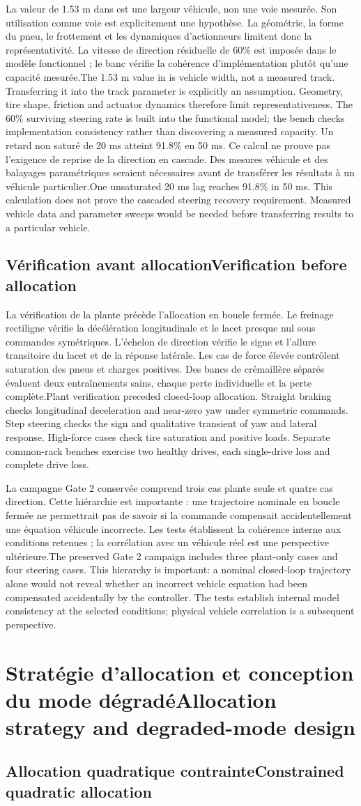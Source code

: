 \documentclass[11pt,a4paper,oneside]{report}
\newcommand{\bi}[2]{\iffrench #2\else #1\fi}
\newcommand{\chap}[2]{\chapter{\bi{#1}{#2}}}
\renewcommand{\sec}[2]{\section{\bi{#1}{#2}}}
\begin{document}
\bi{The 1.53 m value in \cite{li} is vehicle width, not a measured track. Transferring it into the track parameter is explicitly an assumption. Geometry, tire shape, friction and actuator dynamics therefore limit representativeness. The 60\% surviving steering rate is built into the functional model; the bench checks implementation consistency rather than discovering a measured capacity.}{La valeur de 1.53 m dans \cite{li} est une largeur véhicule, non une voie mesurée. Son utilisation comme voie est explicitement une hypothèse. La géométrie, la forme du pneu, le frottement et les dynamiques d'actionneurs limitent donc la représentativité. La vitesse de direction résiduelle de 60\% est imposée dans le modèle fonctionnel ; le banc vérifie la cohérence d'implémentation plutôt qu'une capacité mesurée.}
\bi{One unsaturated 20 ms lag reaches 91.8\% in 50 ms. This calculation does not prove the cascaded steering recovery requirement. Measured vehicle data and parameter sweeps would be needed before transferring results to a particular vehicle.}{Un retard non saturé de 20 ms atteint 91.8\% en 50 ms. Ce calcul ne prouve pas l'exigence de reprise de la direction en cascade. Des mesures véhicule et des balayages paramétriques seraient nécessaires avant de transférer les résultats à un véhicule particulier.}

\sec{Verification before allocation}{Vérification avant allocation}
\bi{Plant verification preceded closed-loop allocation. Straight braking checks longitudinal deceleration and near-zero yaw under symmetric commands. Step steering checks the sign and qualitative transient of yaw and lateral response. High-force cases check tire saturation and positive loads. Separate common-rack benches exercise two healthy drives, each single-drive loss and complete drive loss.}{La vérification de la plante précède l'allocation en boucle fermée. Le freinage rectiligne vérifie la décélération longitudinale et le lacet presque nul sous commandes symétriques. L'échelon de direction vérifie le signe et l'allure transitoire du lacet et de la réponse latérale. Les cas de force élevée contrôlent saturation des pneus et charges positives. Des bancs de crémaillère séparés évaluent deux entraînements sains, chaque perte individuelle et la perte complète.}

\bi{The preserved Gate 2 campaign includes three plant-only cases and four steering cases. This hierarchy is important: a nominal closed-loop trajectory alone would not reveal whether an incorrect vehicle equation had been compensated accidentally by the controller. The tests establish internal model consistency at the selected conditions; physical vehicle correlation is a subsequent perspective.}{La campagne Gate 2 conservée comprend trois cas plante seule et quatre cas direction. Cette hiérarchie est importante : une trajectoire nominale en boucle fermée ne permettrait pas de savoir si la commande compensait accidentellement une équation véhicule incorrecte. Les tests établissent la cohérence interne aux conditions retenues ; la corrélation avec un véhicule réel est une perspective ultérieure.}
\chap{Allocation strategy and degraded-mode design}{Stratégie d'allocation et conception du mode dégradé}
\sec{Constrained quadratic allocation}{Allocation quadratique contrainte}
\end{document}
